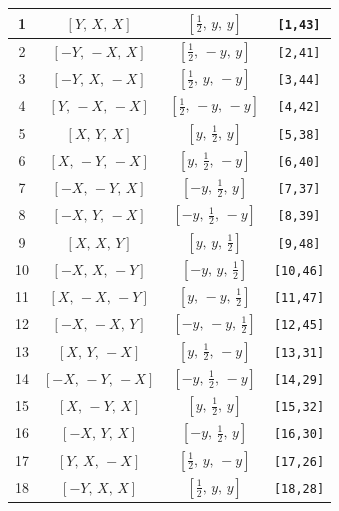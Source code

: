\documentclass[fleqn,8pt]{jsarticle}
\begin{document}
\begin{longtable}{cccc}
1 & $\left[ Y,\, X,\, X \right]$ & $\left[ \frac{1}{2},\, y,\, y \right]$ & {\tt [1,43]} \\ \hline
2 & $\left[ - Y,\, - X,\, X \right]$ & $\left[ \frac{1}{2},\, - y,\, y \right]$ & {\tt [2,41]} \\ \hline
3 & $\left[ - Y,\, X,\, - X \right]$ & $\left[ \frac{1}{2},\, y,\, - y \right]$ & {\tt [3,44]} \\ \hline
4 & $\left[ Y,\, - X,\, - X \right]$ & $\left[ \frac{1}{2},\, - y,\, - y \right]$ & {\tt [4,42]} \\ \hline
5 & $\left[ X,\, Y,\, X \right]$ & $\left[ y,\, \frac{1}{2},\, y \right]$ & {\tt [5,38]} \\ \hline
6 & $\left[ X,\, - Y,\, - X \right]$ & $\left[ y,\, \frac{1}{2},\, - y \right]$ & {\tt [6,40]} \\ \hline
7 & $\left[ - X,\, - Y,\, X \right]$ & $\left[ - y,\, \frac{1}{2},\, y \right]$ & {\tt [7,37]} \\ \hline
8 & $\left[ - X,\, Y,\, - X \right]$ & $\left[ - y,\, \frac{1}{2},\, - y \right]$ & {\tt [8,39]} \\ \hline
9 & $\left[ X,\, X,\, Y \right]$ & $\left[ y,\, y,\, \frac{1}{2} \right]$ & {\tt [9,48]} \\ \hline
10 & $\left[ - X,\, X,\, - Y \right]$ & $\left[ - y,\, y,\, \frac{1}{2} \right]$ & {\tt [10,46]} \\ \hline
11 & $\left[ X,\, - X,\, - Y \right]$ & $\left[ y,\, - y,\, \frac{1}{2} \right]$ & {\tt [11,47]} \\ \hline
12 & $\left[ - X,\, - X,\, Y \right]$ & $\left[ - y,\, - y,\, \frac{1}{2} \right]$ & {\tt [12,45]} \\ \hline
13 & $\left[ X,\, Y,\, - X \right]$ & $\left[ y,\, \frac{1}{2},\, - y \right]$ & {\tt [13,31]} \\ \hline
14 & $\left[ - X,\, - Y,\, - X \right]$ & $\left[ - y,\, \frac{1}{2},\, - y \right]$ & {\tt [14,29]} \\ \hline
15 & $\left[ X,\, - Y,\, X \right]$ & $\left[ y,\, \frac{1}{2},\, y \right]$ & {\tt [15,32]} \\ \hline
16 & $\left[ - X,\, Y,\, X \right]$ & $\left[ - y,\, \frac{1}{2},\, y \right]$ & {\tt [16,30]} \\ \hline
17 & $\left[ Y,\, X,\, - X \right]$ & $\left[ \frac{1}{2},\, y,\, - y \right]$ & {\tt [17,26]} \\ \hline
18 & $\left[ - Y,\, X,\, X \right]$ & $\left[ \frac{1}{2},\, y,\, y \right]$ & {\tt [18,28]} \\ \hline

\end{longtable}
\end{document}
